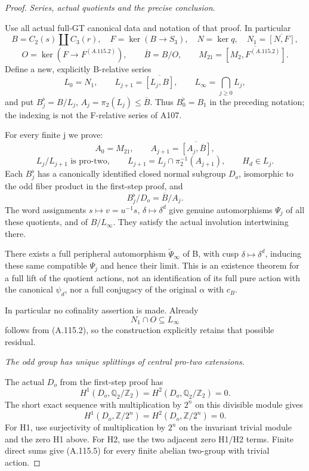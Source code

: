 \begin{proof}
\medskip\noindent\emph{Series, actual quotients and the precise conclusion}.

Use all actual full-GT canonical data and notation of that proof. In particular
\[
B=C_2(s)\amalg C_3(r),\quad F=\ker(B\to S_3),\quad
N=\ker q,\quad N_1=\overline{[N,F]},
\]
\[
O=\ker(F\to F^{(A.115.2)}),\qquad \overline B=B/O,\qquad
M_{21}=\overline{[M_2,F^{(A.115.2)}]}.
\]
Define a new, explicitly B-relative series
\[
L_0=N_1,\qquad L_{j+1}=\overline{[L_j,B]},\qquad
L_\infty=\bigcap_{j\ge0}L_j,
\]
and put \(B_j^\flat=B/L_j\), \(A_j=\pi_2(L_j)\le\overline B\). Thus \(B_0^\flat=B_1\) in the preceding notation; the indexing is not the F-relative series of A107.

For every finite j we prove:
\[
A_0=M_{21},\qquad A_{j+1}=\overline{[A_j,\overline B]},       \tag{A.115.1}
\]
\[
L_j/L_{j+1}\text{ is pro-two},\qquad
L_{j+1}=L_j\cap\pi_2^{-1}(A_{j+1}),\qquad H_d\in L_j.       \tag{A.115.2}
\]
Each \(B_j^\flat\) has a canonically identified closed normal subgroup \(D_o\), isomorphic to the odd fiber product in the first-step proof, and
\[
B_j^\flat/D_o=\overline B/A_j.                              \tag{A.115.3}
\]
The word assignments \(s\mapsto v=u^{-1}s\), \(\delta\mapsto\delta^d\) give genuine automorphisms \(\Psi_j\) of all these quotients, and of \(B/L_\infty\). They satisfy the actual involution intertwining there.

There exists a full peripheral automorphism \(\widetilde\Psi_\infty\) of B, with cusp \(\delta\mapsto\delta^d\), inducing these same compatible \(\Psi_j\) and hence their limit. This is an existence theorem for a full lift of the quotient actions, not an identification of its full pure action with the canonical \(\psi_d\), nor a full conjugacy of the original \(\alpha\) with \(c_B\).

In particular no cofinality assertion is made. Already
\[
N_1\cap O\subseteq L_\infty                                  \tag{A.115.4}
\]
follows from (A.115.2), so the construction explicitly retains that possible residual.

\medskip\noindent\emph{The odd group has unique splittings of central pro-two extensions}.

The actual \(D_o\) from the first-step proof has
\[
H^1(D_o,\mathbb Q_2/\mathbb Z_2)
=H^2(D_o,\mathbb Q_2/\mathbb Z_2)=0.
\]
The short exact sequence with multiplication by \(2^n\) on this divisible module gives
\[
H^1(D_o,\mathbb Z/2^n)=H^2(D_o,\mathbb Z/2^n)=0.             \tag{A.115.5}
\]
For H1, use surjectivity of multiplication by \(2^n\) on the invariant trivial module and the zero H1 above. For H2, use the two adjacent zero H1/H2 terms. Finite direct sums give (A.115.5) for every finite abelian two-group with trivial action.


\end{proof}
